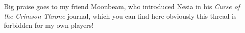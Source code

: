Big praise goes to my friend Moonbeam, who introduced Nesia in his {\itshape Curse of the Crimson Throne} journal, which you can find here obviously this thread is forbidden for my own players! 